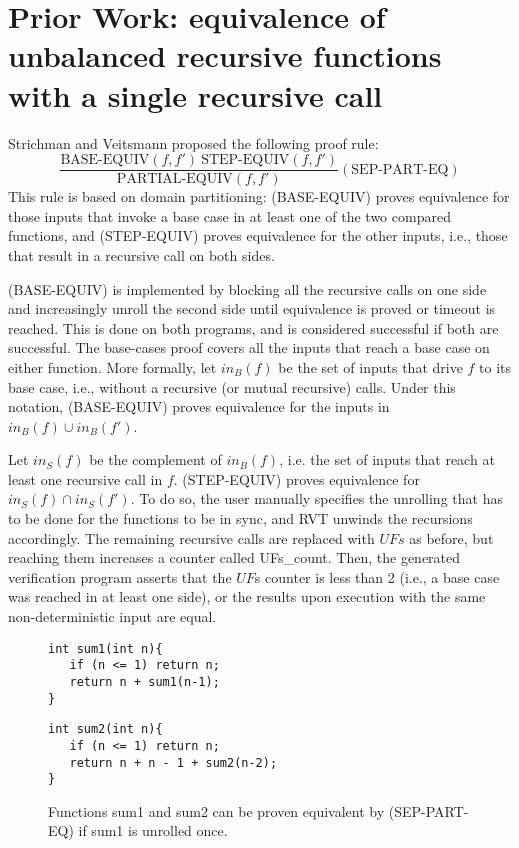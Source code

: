 \section{Prior Work: equivalence of unbalanced recursive functions with a single recursive call}
\label{sec:prev}
Strichman and Veitsmann \cite{DBLP:conf/fm/StrichmanV16} proposed the following  proof rule:
\begin{equation}
 {\frac {\text{BASE-EQUIV}(f,f') \:\text{STEP-EQUIV}(f,f')}{\text{PARTIAL-EQUIV}(f,f')}} 
  (\text{SEP-PART-EQ})
\end{equation}
This rule is based on domain partitioning: (BASE-EQUIV) proves equivalence for those inputs that invoke a base case in at least one of the two compared functions, and (STEP-EQUIV) proves equivalence for the other inputs, i.e., those that result in a recursive call on both sides.

(BASE-EQUIV) is implemented by blocking all the recursive calls on one side and increasingly unroll the second side until equivalence is proved or timeout is reached. This is done on both programs, and is considered successful if both are successful. The base-cases proof covers all the inputs that reach a base case on either function. More formally, let $in_B(f)$ be the set of inputs that drive $f$ to its base case, i.e., without a recursive (or mutual recursive) calls. Under this notation, (BASE-EQUIV) proves equivalence for the  inputs in $in_B(f) \cup in_B(f')$.

Let $in_S(f)$ be the complement of $in_B(f)$, i.e. the set of inputs that reach at least one recursive call in $f$. (STEP-EQUIV) proves equivalence for $in_S(f) \cap in_S(f')$. To do so, the user manually specifies the unrolling that has to be done for the functions to be in sync, and RVT unwinds the recursions accordingly. The remaining recursive calls are replaced with $UFs$ as before, but reaching them increases a counter called UFs\_count. Then, the generated verification program asserts that the $UF$s counter is less than 2  (i.e., a base case was reached in at least one side), or the results upon execution with the same non-deterministic input are equal. 

\begin{figure}[h]
\begin{center}
\begin{minipage}{7 cm}
\begin{lstlisting}
int sum1(int n){
   if (n <= 1) return n;
   return n + sum1(n-1);
}
\end{lstlisting}
\end{minipage}
\begin{minipage}{7 cm}
\begin{lstlisting}
int sum2(int n){
   if (n <= 1) return n;
   return n + n - 1 + sum2(n-2);
}
\end{lstlisting}
\end{minipage}
\caption{Functions sum1 and sum2 can be proven equivalent by (SEP-PART-EQ) if sum1 is unrolled once.}
\label{fig:sum}
\end{center}
\end{figure}

